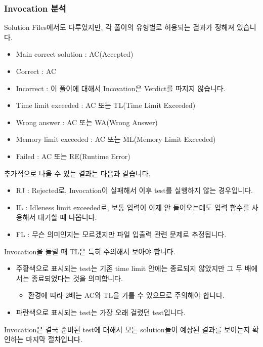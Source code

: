 \documentclass{article}
\begin{document}
    \subsubsection{Invocation 분석}
    Solution Files에서도 다루었지만, 각 풀이의 유형별로 허용되는 결과가 정해져 있습니다.
    \begin{itemize}
        \item Main correct solution : AC(Accepted)
        \item Correct : AC
        \item Incorrect : 이 풀이에 대해서 Incovation은 Verdict를 따지지 않습니다.
        \item Time limit exceeded : AC 또는 TL(Time Limit Exceeded)
        \item Wrong answer : AC 또는 WA(Wrong Answer)
        \item Memory limit exceeded : AC 또는 ML(Memory Limit Exceeded)
        \item Failed : AC 또는 RE(Runtime Error)
    \end{itemize}
    추가적으로 나올 수 있는 결과는 다음과 같습니다.
    \begin{itemize}
        \item RJ : Rejected로, Invocation이 실패해서 이후 test를 실행하지 않는 경우입니다.
        \item IL : Idleness limit exceeded로, 보통 입력이 이제 안 들어오는데도 입력 함수를 사용해서 대기할 때 나옵니다.
        \item FL : 무슨 의미인지는 모르겠지만 파일 입출력 관련 문제로 추정됩니다.
    \end{itemize}
    Invocation을 돌릴 때 TL은 특히 주의해서 보아야 합니다.
    \begin{itemize}
        \item 주황색으로 표시되는 test는 기존 time limit 안에는 종료되지 않았지만 그 두 배에서는 종료되었다는 것을 의미합니다.
        \begin{itemize}
            \item 환경에 따라 2배는 AC와 TL을 가를 수 있으므로 주의해야 합니다.
        \end{itemize}
        \item 파란색으로 표시되는 test는 가장 오래 걸렸던 test입니다.
    \end{itemize}
    Invocation은 결국 준비된 test에 대해서 모든 solution들이 예상된 결과를 보이는지 확인하는 마지막 절차입니다.
\end{document}

